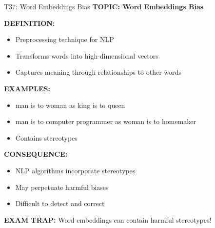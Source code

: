 \documentclass[8pt]{beamer}
\begin{document}
	\begin{frame}{T37: Word Embeddings Bias}
		\fontsize{6.5}{7.5}\selectfont
		\textbf{TOPIC: Word Embeddings Bias}
		
		\vspace{0.1cm}
		\textbf{DEFINITION:}
		\begin{itemize}
			\item Preprocessing technique for NLP
			\item Transforms words into high-dimensional vectors
			\item Captures meaning through relationships to other words
		\end{itemize}
		
		\vspace{0.1cm}
		\textbf{EXAMPLES:}
		\begin{itemize}
			\item man is to woman as king is to queen
			\item man is to computer programmer as woman is to homemaker
			\item Contains stereotypes
		\end{itemize}
		
		\vspace{0.1cm}
		\textbf{CONSEQUENCE:}
		\begin{itemize}
			\item NLP algorithms incorporate stereotypes
			\item May perpetuate harmful biases
			\item Difficult to detect and correct
		\end{itemize}
		
		\textcolor{myred}{\textbf{EXAM TRAP:}} Word embeddings can contain \textcolor{myblue}{harmful stereotypes}!
	\end{frame}
	
\end{document}
